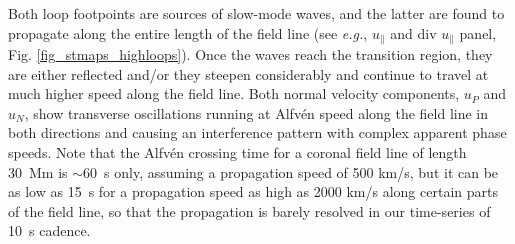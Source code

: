 \documentclass{aa}
\begin{document}
{Both loop footpoints are sources of slow-mode waves, and the latter are found to propagate along the entire length of the field line (see {\emph{e.g.}}, $u_{\parallel}$ and div $u_{\parallel}$ panel, Fig. \ref{fig_stmaps_highloops}). Once the waves reach the transition region, they are either reflected and/or they steepen considerably and continue to travel at much higher speed along the field line. %
Both normal velocity components, $u_P$ and $u_N$, show transverse oscillations running at Alfv\'en speed along the field line in both directions and causing an interference pattern with complex apparent phase speeds.  
Note that the Alfv\'en crossing time for a coronal field line of length 30~Mm is $\sim$60~s only, assuming a propagation speed of 500 km/s, but it can be as low as 15~s for a propagation speed as high as 2000 km/s along certain parts of the field line, so that the propagation is barely resolved in our time-series of 10~s cadence.








}
\end{document}
